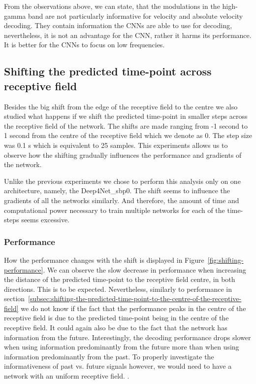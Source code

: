 From the observations above, we can state, that the modulations in the high-gamma band are not particularly informative for velocity and absolute velocity decoding.
They contain information the CNNs are able to use for decoding, nevertheless, it is not an advantage for the CNN, rather it harms its performance.
It is better for the CNNs to focus on low frequencies.


\subsection{Shifting the predicted time-point across receptive field}\label{subsec:shifting-the-predicted-time-point-across-receptive-field}
Besides the big shift from the edge of the receptive field to the centre we also studied what happens if we shift the predicted time-point in smaller steps across the receptive field of the network. 
The shifts are made ranging from  -1 second  to 1 second from the centre of the receptive field which we denote as 0.
The step size was 0.1 s which is equivalent to 25 samples.
This experiments allows us to observe how the shifting gradually influences the performance and gradients of the network. 

Unlike the previous experiments we chose to perform this analysis only on one architecture, namely, the Deep4Net\_sbp0. 
The shift seems to influence the gradients of all the networks similarly.
And therefore, the amount of time and computational power necessary to train multiple networks for each of the time-steps seems excessive.  

\subsubsection{Performance}\label{subsubsec:across-shiftig-performace}
How the performance changes with the shift is displayed in Figure~\ref{fig:shifting-performance}.
We can observe the slow decrease in performance when increasing the distance of the predicted time-point to the receptive field centre, in both directions. 
This is to be expected. 
Nevertheless, similarly to performance in section~\ref{subsec:shifting-the-predicted-time-point-to-the-centre-of-the-receptive-field} we do not know if the fact that the performance peaks in the centre of the receptive field is due to the predicted time-point being in the centre of the receptive field.
It could again also be due to the fact that the network has information from the future. 
Interestingly, the decoding performance drops slower when using information predominantly from the future more than when using information predominantly from the past.
To properly investigate the informativeness of past vs. future signals however, we would need to have a network with an uniform receptive field. 
.

